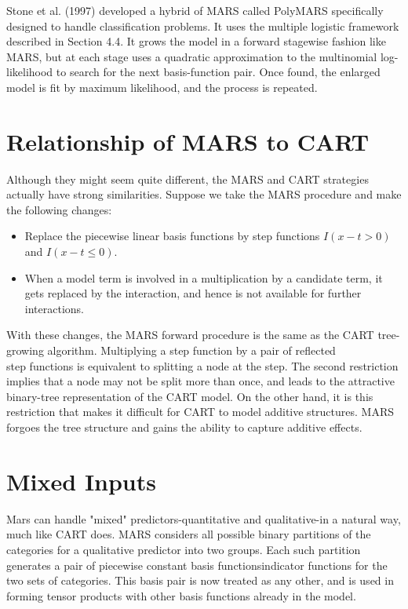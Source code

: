 \documentclass[10pt]{article}
\begin{document}
Stone et al. (1997) developed a hybrid of MARS called PolyMARS specifically designed to handle classification problems. It uses the multiple logistic framework described in Section 4.4. It grows the model in a forward stagewise fashion like MARS, but at each stage uses a quadratic approximation to the multinomial log-likelihood to search for the next basis-function pair. Once found, the enlarged model is fit by maximum likelihood, and the process is repeated.

\section*{Relationship of MARS to CART}
Although they might seem quite different, the MARS and CART strategies actually have strong similarities. Suppose we take the MARS procedure and make the following changes:

\begin{itemize}
  \item Replace the piecewise linear basis functions by step functions $I(x-t> 0)$ and $I(x-t \leq 0)$.
  \item When a model term is involved in a multiplication by a candidate term, it gets replaced by the interaction, and hence is not available for further interactions.
\end{itemize}

With these changes, the MARS forward procedure is the same as the CART tree-growing algorithm. Multiplying a step function by a pair of reflected\\
step functions is equivalent to splitting a node at the step. The second restriction implies that a node may not be split more than once, and leads to the attractive binary-tree representation of the CART model. On the other hand, it is this restriction that makes it difficult for CART to model additive structures. MARS forgoes the tree structure and gains the ability to capture additive effects.

\section*{Mixed Inputs}
Mars can handle "mixed" predictors-quantitative and qualitative-in a natural way, much like CART does. MARS considers all possible binary partitions of the categories for a qualitative predictor into two groups. Each such partition generates a pair of piecewise constant basis functionsindicator functions for the two sets of categories. This basis pair is now treated as any other, and is used in forming tensor products with other basis functions already in the model.
\end{document}
